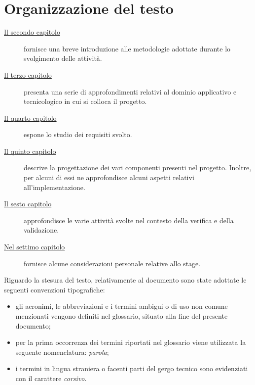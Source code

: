 \section{Organizzazione del testo}

\begin{description}
    \item[{\hyperref[cap:processi-metodologie]{Il secondo capitolo}}] fornisce una breve introduzione alle metodologie adottate durante lo svolgimento delle attività.
    
    \item[{\hyperref[cap:descrizione-stage]{Il terzo capitolo}}] presenta una serie di approfondimenti relativi al dominio applicativo e tecnicologico in cui si colloca il progetto.
    
    \item[{\hyperref[cap:analisi-requisiti]{Il quarto capitolo}}] espone lo studio dei requisiti svolto.
    
    \item[{\hyperref[cap:progettazione-codifica]{Il quinto capitolo}}] descrive la progettazione dei vari componenti presenti nel progetto. Inoltre, per alcuni di essi ne approfondisce alcuni aspetti relativi all'implementazione.
    
    \item[{\hyperref[cap:verifica-validazione]{Il sesto capitolo}}] approfondisce le varie attività svolte nel contesto della verifica e della validazione.
    
    \item[{\hyperref[cap:conclusioni]{Nel settimo capitolo}}] fornisce alcune considerazioni personale relative allo stage.
\end{description}

Riguardo la stesura del testo, relativamente al documento sono state adottate le seguenti convenzioni tipografiche:
\begin{itemize}
	\item gli acronimi, le abbreviazioni e i termini ambigui o di uso non comune menzionati vengono definiti nel glossario, situato alla fine del presente documento;
	\item per la prima occorrenza dei termini riportati nel glossario viene utilizzata la seguente nomenclatura: \emph{parola}\glsfirstoccur;
	\item i termini in lingua straniera o facenti parti del gergo tecnico sono evidenziati con il carattere \emph{corsivo}.
\end{itemize}